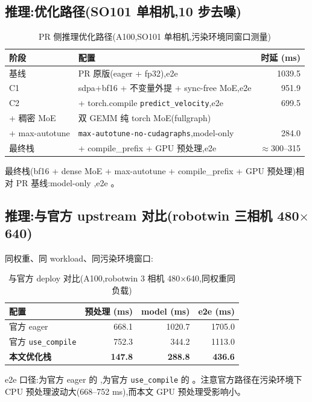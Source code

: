 \documentclass[11pt]{ctexart}
\begin{document}
\subsection{推理:优化路径(SO101 单相机,10 步去噪)}
\begin{table}[htbp]
\centering\small
\caption{PR 侧推理优化路径(A100,SO101 单相机,污染环境同窗口测量)}
\begin{tabular}{@{}llr@{}}
\toprule
阶段 & 配置 & \multicolumn{1}{r}{时延 (ms)} \\
\midrule
基线 & PR 原版(eager + fp32),e2e & 1039.5 \\
C1 & sdpa+bf16 + 不变量外提 + sync-free MoE,e2e & 951.9 \\
C2 & + torch.compile \texttt{predict\_velocity},e2e & 699.5 \\
+ 稠密 MoE & 双 GEMM 纯 torch MoE(fullgraph) & \dimtext{—} \\
+ max-autotune & \texttt{max-autotune-no-cudagraphs},model-only & 284.0 \\
最终栈 & + compile\_prefix + GPU 预处理,e2e & $\approx$300--315 \\
\bottomrule
\end{tabular}
\end{table}

最终栈(bf16 + dense MoE + max-autotune + compile\_prefix + GPU 预处理)相对 PR 基线:model-only ,e2e 。

\subsection{推理:与官方 upstream 对比(robotwin 三相机 480$\times$640)}
同权重、同 workload、同污染环境窗口:
\begin{table}[htbp]
\centering\small
\caption{与官方 deploy 对比(A100,robotwin 3 相机 480$\times$640,同权重同负载)}
\begin{tabular}{@{}lrrr@{}}
\toprule
配置 & \multicolumn{1}{r}{预处理 (ms)} & \multicolumn{1}{r}{model (ms)} & \multicolumn{1}{r}{e2e (ms)} \\
\midrule
官方 eager & 668.1 & 1020.7 & 1705.0 \\
官方 \texttt{use\_compile} & 752.3 & 344.2 & 1113.0 \\
\textbf{本文优化栈} & \textbf{147.8} & \textbf{288.8} & \textbf{436.6} \\
\bottomrule
\end{tabular}
\end{table}

e2e 口径:为官方 eager 的 ,为官方 \texttt{use\_compile} 的 。注意官方路径在污染环境下 CPU 预处理波动大(668--752 ms),而本文 GPU 预处理受影响小。
\end{document}
